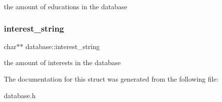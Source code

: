 the amount of educations in the database \mbox{\label{structdatabase_aa677885704df7723ae0211e7f8977cc0}} 
\subsubsection{\texorpdfstring{interest\+\_\+string}{interest\_string}}
{\footnotesize\ttfamily char$\ast$$\ast$ database\+::interest\+\_\+string}

the amount of interests in the database 

The documentation for this struct was generated from the following file\+:\begin{DoxyCompactItemize}
\item 
database.\+h\end{DoxyCompactItemize}

